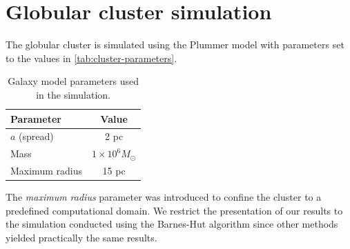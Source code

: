 \section{Globular cluster simulation}
The globular cluster is simulated using the Plummer model with parameters set to the values in \autoref{tab:cluster-parameters}.
\begin{table}[htp]
    \centering
    \begin{tabular}{|l|c|}
        \hline
        \textbf{Parameter} & \textbf{Value}          \\
        \hline
        $a$ (spread)       & 2 pc                    \\
        Mass               & $1 \times 10^6 M_\odot$ \\
        Maximum radius     & 15 pc                   \\
        \hline
    \end{tabular}
    \caption{Galaxy model parameters used in the simulation.}
    \label{tab:cluster-parameters}
\end{table}
The \textit{maximum radius} parameter was introduced to confine the cluster to a predefined computational domain.
We restrict the presentation of our results to the simulation conducted using the Barnes-Hut algorithm since other methods yielded practically the same results.

